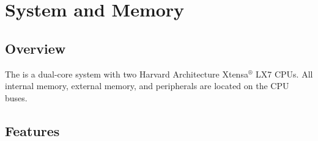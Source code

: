 \documentclass[main\_\_EN.tex]{subfiles}
\begin{document}

\ifglobal
\else
    {\let\clearpage\relax \listoftodos}
    \tableofcontents
\fi




\hypertarget{sysmem}{}
\chapter{System and Memory}
\label{mod:sysmem}


\section{Overview}

The \chipname{} is a dual-core system with two Harvard Architecture Xtensa$^®$ LX7 CPUs. All internal memory, external memory, and peripherals are located on the CPU buses.

\section{Features}
\end{document}
